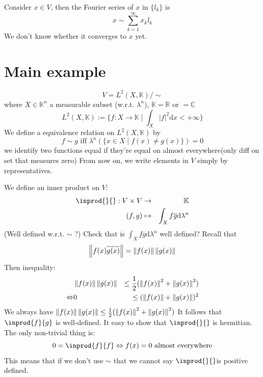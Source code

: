 \documentclass{book}
\newcommand{\abs}[1]{\left\lvert #1 \right\rvert}
\begin{document}
Consider $x\in V$, then the Fourier series of $x$ in $\{l_k\}$ is $$x\sim\sum\limits_{k=1}^\infty x_k l_k$$
We don't know whether it converges to $x$ yet.
\section{Main example}
$$V=L^2(X,\mathbb{K})/\sim$$
where $X\in \mathbb{K}^n$ a measurable subset (w.r.t. $\lambda^n$), $\mathbb{K}=\mathbb{R}\text{ or }=\mathbb{C}$
$$L^2(X,\mathbb{K}):=\{f:X\rightarrow \mathbb{K}\mid \int_X\abs{f}^2\text{d}x<+\infty\}$$
We define a equivalence relation on $L^2(X,\mathbb{K})$ by$$f\sim g\text{ iff }\lambda^n\left(\{x\in X\mid f(x)\neq g(x)\}\right)=0$$
we identify two functions equal if they're equal on almost everywhere(only diff on set that measures zero) From now on, we write elements in $V$ simply by representatives.

We define an inner product on $V$:
$$\begin{aligned}
    \inprod{}{}:V\times V &\rightarrow &\mathbb{K}\\
    (f,g)&\mapsto&\int_Xf\overline g\text{d}\lambda^n
\end{aligned}$$
(Well defined w.r.t. $\sim$ ?) Check that is $\int_Xf\overline{g}\text{d}\lambda^n$ well defined? Recall that$$\left\lVert f(x)\overline{g(x)} \right\rVert=\left\lVert f(x) \right\rVert\left\lVert g(x) \right\rVert$$ Then inequality:
$$\begin{aligned}
    &\left\lVert f(x) \right\rVert\left\lVert g(x) \right\rVert&\leq\frac{1}{2}(\left\lVert f(x) \right\rVert^2+\left\lVert g(x) \right\rVert^2)\\
    \Leftrightarrow&0&\leq(\left\lVert f(x) \right\rVert+\left\lVert g(x) \right\rVert)^2
\end{aligned}$$
We always have $\left\lVert f(x) \right\rVert\left\lVert g(x) \right\rVert\leq\frac{1}{2}(\left\lVert f(x) \right\rVert^2+\left\lVert g(x) \right\rVert^2)$ It follows that $\inprod{f}{g}$ is well-defined. It easy to show that $\inprod{}{}$ is hermitian. The only non-trivial thing is:
$$0=\inprod{f}{f}\Leftrightarrow f(x)=0\text{ almost everywhere}$$
This means that if we don't use $\sim$ that we cannot say $\inprod{}{} $is positive defined.
\end{document}
